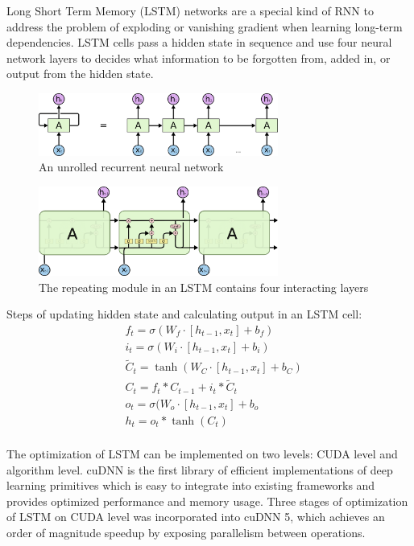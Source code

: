 \documentclass{article}
\begin{document}
Long Short Term Memory (LSTM)\cite{hochreiter1997long} networks are a special kind of RNN to address the problem of exploding or vanishing gradient when learning long-term dependencies. LSTM cells pass a hidden state in sequence and use four neural network layers to decides what information to be forgotten from, added in, or output from the hidden state.

\begin{figure}[h]
\centering
\includegraphics[width=0.7\textwidth]{rnn}
\caption{An unrolled recurrent neural network\cite{understandLSTM}}
\end{figure}

\begin{figure}[h]
\centering
\includegraphics[width=0.7\textwidth]{lstm}
\caption{The repeating module in an LSTM contains four interacting layers\cite{understandLSTM}}
\end{figure}

Steps of updating hidden state and calculating output in an LSTM cell:
\begin{equation}
  \begin{split}
    & f_t=\sigma(W_f\cdot [h_{t-1},x_t]+b_f) \\
    & i_t=\sigma(W_i\cdot [h_{t-1},x_t]+b_i) \\
    & \widetilde{C}_t=\tanh(W_C\cdot [h_{t-1},x_t]+b_C) \\
    & C_t=f_t * C_{t-1}+i_t * \widetilde{C}_t \\
    & o_t=\sigma(W_o\cdot [h_{t-1},x_t]+b_o \\
    & h_t=o_t * \tanh(C_t) \\
  \end{split}
\end{equation}


The optimization of LSTM can be implemented on two levels: CUDA level and algorithm level. cuDNN\cite{chetlur2014cudnn} is the first library of efficient implementations of deep learning primitives which is easy to integrate into existing frameworks and provides optimized performance and memory usage. Three stages of optimization of LSTM on CUDA level was incorporated into cuDNN 5, which achieves an order of magnitude speedup by exposing parallelism between operations.
\end{document}
